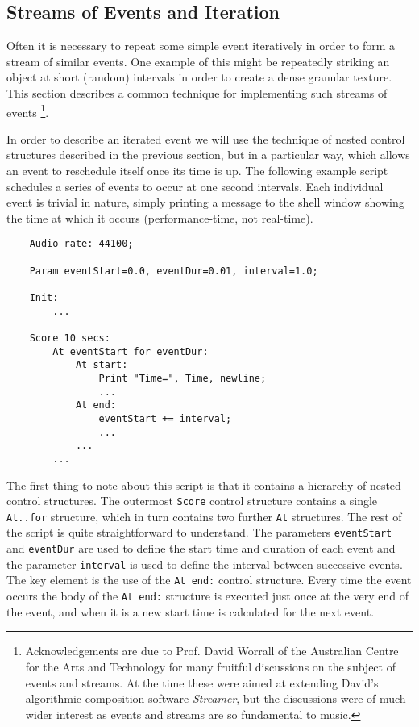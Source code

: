 \subsection{Streams of Events and Iteration}
Often it is necessary to repeat some simple event iteratively in order to
form a stream of similar events. One example of this might be repeatedly
striking an object at short (random) intervals in order to create a
dense granular texture. This section describes a common technique
for implementing such streams of events \footnote{Acknowledgements are due
to Prof. David Worrall of the Australian Centre for the Arts and
Technology for many fruitful discussions on the subject of events and
streams. At the time these were aimed at extending David's algorithmic
composition software \emph{Streamer}, but the discussions were of much
wider interest as events and streams are so fundamental to music.}.

In order to describe an iterated event we will use the technique of
nested control structures described in the previous section, but in
a particular way, which allows an
event to reschedule itself once its time is up. The following example
script schedules a series of events to occur at one second intervals.
Each individual event is trivial in nature, simply printing a message
to the shell window showing the time at which it occurs (performance-time,
not real-time).
 
\begin{verbatim}
    Audio rate: 44100;

    Param eventStart=0.0, eventDur=0.01, interval=1.0;

    Init:
        ...

    Score 10 secs:
        At eventStart for eventDur:
            At start:
                Print "Time=", Time, newline;
                ...
            At end:
                eventStart += interval;
                ...
            ...
        ...
\end{verbatim}

The first thing to note about this script is that it contains a
hierarchy of nested control structures. The outermost \verb|Score|
control structure contains a single \verb|At..for| structure, which in
turn contains two further \verb|At| structures. The rest of the script
is quite straightforward to understand. The parameters \verb|eventStart|
and \verb|eventDur| are used to define the start time and duration of
each event and the parameter \verb|interval| is used to define the
interval between successive events. The key element is the use of the
\verb|At end:| control structure. Every time the event occurs
the body of the \verb|At end:| structure is executed just once at the
very end of the event, and when it is a new start time is calculated
for the next event.


